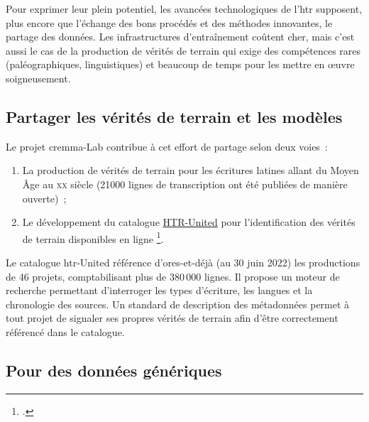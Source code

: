 \documentclass[a4paper,12pt,twoside]{book}
\newcommand{\siecle}[1]{\textsc{#1}\ieme}
\begin{document}
			Pour exprimer leur plein potentiel, les avancées technologiques de l'\gls{htr}
			supposent, plus encore que l'échange des bons procédés et des méthodes
			innovantes, le partage des données. Les infrastructures d'entraînement
			coûtent cher, mais c'est aussi le cas de la production de vérités de
			terrain qui exige des compétences rares (paléographiques, linguistiques)
			et beaucoup de temps pour les mettre en œuvre soigneusement.
			
			\subsection{Partager les vérités de terrain et les modèles}
			
				Le projet \gls{cremma}-Lab contribue à cet effort de partage selon deux voies~:
				
				\begin{enumerate}
					
					\item
					La production de vérités de terrain pour les écritures latines allant
					du Moyen Âge au \siecle{xx} siècle (21000 lignes de transcription ont été publiées de manière ouverte)~;
					\item
					Le développement du catalogue
					\href{https://htr-united.github.io/catalog.html}{HTR-United} pour
					l'identification des vérités de terrain disponibles en ligne
					\footcite{campsCremmaLabProjectsTranscription2022, chagueSharingHTRDatasets2022}.
				\end{enumerate}
				
				Le catalogue \gls{htr}-United référence d'ores-et-déjà (au 30 juin 2022) les
				productions de 46 projets, comptabilisant plus de 380\,000 lignes. Il
				propose un moteur de recherche permettant d'interroger les types
				d'écriture, les langues et la chronologie des sources. Un standard de
				description des métadonnées permet à tout projet de signaler ses propres
				vérités de terrain afin d'être correctement référencé dans le catalogue.
			
			\subsection{Pour des données génériques}
			
\end{document}

